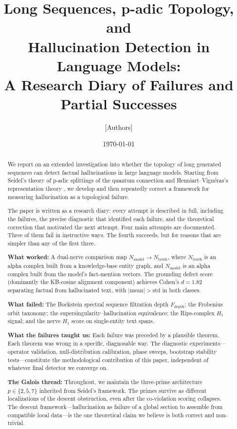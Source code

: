 \documentclass[11pt]{amsart}
\title[Long Sequences, Topology, and Hallucination]{%
  Long Sequences, p-adic Topology, and\\
  Hallucination Detection in Language Models:\\
  A Research Diary of Failures and Partial Successes}
\author{[Authors]}
\date{\today}
\theoremstyle{definition}
\newcommand{\Nmod}{N_{\mathrm{model}}}
\newcommand{\Ntruth}{N_{\mathrm{truth}}}
\begin{document}
\maketitle

\begin{abstract}
We report on an extended investigation into whether the topology of long
generated sequences can detect factual hallucinations in large language models.
Starting from Seidel's theory of p-adic splittings of the quantum connection
\cite{Seidel25} and Henniart--Vign\'eras's representation theory \cite{HV17},
we develop and then repeatedly correct a framework for measuring
hallucination as a topological failure.

The paper is written as a research diary: every attempt is described in full,
including the failures, the precise diagnostic that identified each failure,
and the theoretical correction that motivated the next attempt.
Four main attempts are documented.
Three of them fail in instructive ways.
The fourth succeeds, but for reasons that are simpler than any of the first three.

\textbf{What worked:} A dual-nerve comparison map $\Nmod \to \Ntruth$,
where $\Ntruth$ is an alpha complex built from a knowledge-base entity graph,
and $\Nmod$ is an alpha complex built from the model's fact-mention vectors.
The grounding defect score (dominantly the KB-cosine alignment component)
achieves Cohen's $d = 1.82$ separating factual from hallucinated text,
with $|\text{mean}| > \text{std}$ in both classes.

\textbf{What failed:} The Bockstein spectral sequence filtration depth
$F_\mathrm{depth}$; the Frobenius orbit taxonomy; the supersingularity--hallucination
equivalence; the Rips-complex $H_1$ signal; and the nerve $H_1$ score on
single-entity text spans.

\textbf{What the failures taught us:}
Each failure was preceded by a plausible theorem.
Each theorem was wrong in a specific, diagnosable way.
The diagnostic experiments---operator validation, null-distribution calibration,
phase sweeps, bootstrap stability tests---constitute the methodological
contribution of this paper, independent of whatever final detector we converge on.

\textbf{The Galois thread:}
Throughout, we maintain the three-prime architecture $p \in \{2, 5, 7\}$ inherited
from Seidel's framework. The primes survive as different localizations of the
descent obstruction, even after the co-violation scoring collapses.
The descent framework---hallucination as failure of a global section to assemble
from compatible local data---is the one theoretical claim we believe is both
correct and non-trivial.
\end{abstract}
\end{document}
